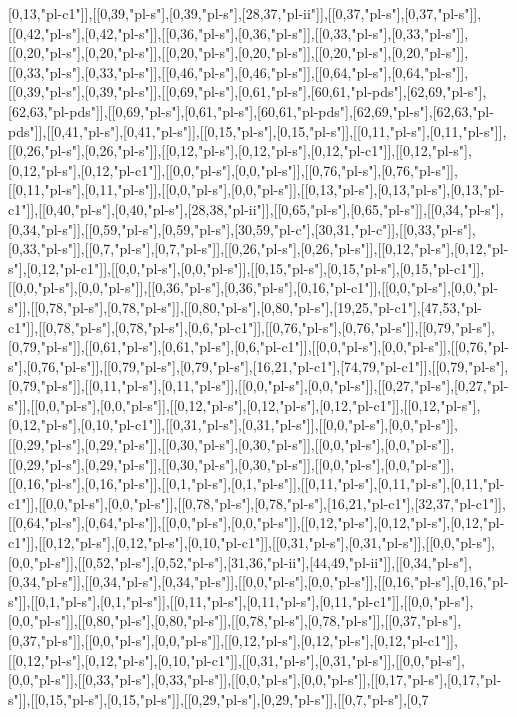 [0,13,"pl-c1"]],[[0,39,"pl-s"],[0,39,"pl-s"],[28,37,"pl-ii"]],[[0,37,"pl-s"],[0,37,"pl-s"]],[[0,42,"pl-s"],[0,42,"pl-s"]],[[0,36,"pl-s"],[0,36,"pl-s"]],[[0,33,"pl-s"],[0,33,"pl-s"]],[[0,20,"pl-s"],[0,20,"pl-s"]],[[0,20,"pl-s"],[0,20,"pl-s"]],[[0,20,"pl-s"],[0,20,"pl-s"]],[[0,33,"pl-s"],[0,33,"pl-s"]],[[0,46,"pl-s"],[0,46,"pl-s"]],[[0,64,"pl-s"],[0,64,"pl-s"]],[[0,39,"pl-s"],[0,39,"pl-s"]],[[0,69,"pl-s"],[0,61,"pl-s"],[60,61,"pl-pds"],[62,69,"pl-s"],[62,63,"pl-pds"]],[[0,69,"pl-s"],[0,61,"pl-s"],[60,61,"pl-pds"],[62,69,"pl-s"],[62,63,"pl-pds"]],[[0,41,"pl-s"],[0,41,"pl-s"]],[[0,15,"pl-s"],[0,15,"pl-s"]],[[0,11,"pl-s"],[0,11,"pl-s"]],[[0,26,"pl-s"],[0,26,"pl-s"]],[[0,12,"pl-s"],[0,12,"pl-s"],[0,12,"pl-c1"]],[[0,12,"pl-s"],[0,12,"pl-s"],[0,12,"pl-c1"]],[[0,0,"pl-s"],[0,0,"pl-s"]],[[0,76,"pl-s"],[0,76,"pl-s"]],[[0,11,"pl-s"],[0,11,"pl-s"]],[[0,0,"pl-s"],[0,0,"pl-s"]],[[0,13,"pl-s"],[0,13,"pl-s"],[0,13,"pl-c1"]],[[0,40,"pl-s"],[0,40,"pl-s"],[28,38,"pl-ii"]],[[0,65,"pl-s"],[0,65,"pl-s"]],[[0,34,"pl-s"],[0,34,"pl-s"]],[[0,59,"pl-s"],[0,59,"pl-s"],[30,59,"pl-c"],[30,31,"pl-c"]],[[0,33,"pl-s"],[0,33,"pl-s"]],[[0,7,"pl-s"],[0,7,"pl-s"]],[[0,26,"pl-s"],[0,26,"pl-s"]],[[0,12,"pl-s"],[0,12,"pl-s"],[0,12,"pl-c1"]],[[0,0,"pl-s"],[0,0,"pl-s"]],[[0,15,"pl-s"],[0,15,"pl-s"],[0,15,"pl-c1"]],[[0,0,"pl-s"],[0,0,"pl-s"]],[[0,36,"pl-s"],[0,36,"pl-s"],[0,16,"pl-c1"]],[[0,0,"pl-s"],[0,0,"pl-s"]],[[0,78,"pl-s"],[0,78,"pl-s"]],[[0,80,"pl-s"],[0,80,"pl-s"],[19,25,"pl-c1"],[47,53,"pl-c1"]],[[0,78,"pl-s"],[0,78,"pl-s"],[0,6,"pl-c1"]],[[0,76,"pl-s"],[0,76,"pl-s"]],[[0,79,"pl-s"],[0,79,"pl-s"]],[[0,61,"pl-s"],[0,61,"pl-s"],[0,6,"pl-c1"]],[[0,0,"pl-s"],[0,0,"pl-s"]],[[0,76,"pl-s"],[0,76,"pl-s"]],[[0,79,"pl-s"],[0,79,"pl-s"],[16,21,"pl-c1"],[74,79,"pl-c1"]],[[0,79,"pl-s"],[0,79,"pl-s"]],[[0,11,"pl-s"],[0,11,"pl-s"]],[[0,0,"pl-s"],[0,0,"pl-s"]],[[0,27,"pl-s"],[0,27,"pl-s"]],[[0,0,"pl-s"],[0,0,"pl-s"]],[[0,12,"pl-s"],[0,12,"pl-s"],[0,12,"pl-c1"]],[[0,12,"pl-s"],[0,12,"pl-s"],[0,10,"pl-c1"]],[[0,31,"pl-s"],[0,31,"pl-s"]],[[0,0,"pl-s"],[0,0,"pl-s"]],[[0,29,"pl-s"],[0,29,"pl-s"]],[[0,30,"pl-s"],[0,30,"pl-s"]],[[0,0,"pl-s"],[0,0,"pl-s"]],[[0,29,"pl-s"],[0,29,"pl-s"]],[[0,30,"pl-s"],[0,30,"pl-s"]],[[0,0,"pl-s"],[0,0,"pl-s"]],[[0,16,"pl-s"],[0,16,"pl-s"]],[[0,1,"pl-s"],[0,1,"pl-s"]],[[0,11,"pl-s"],[0,11,"pl-s"],[0,11,"pl-c1"]],[[0,0,"pl-s"],[0,0,"pl-s"]],[[0,78,"pl-s"],[0,78,"pl-s"],[16,21,"pl-c1"],[32,37,"pl-c1"]],[[0,64,"pl-s"],[0,64,"pl-s"]],[[0,0,"pl-s"],[0,0,"pl-s"]],[[0,12,"pl-s"],[0,12,"pl-s"],[0,12,"pl-c1"]],[[0,12,"pl-s"],[0,12,"pl-s"],[0,10,"pl-c1"]],[[0,31,"pl-s"],[0,31,"pl-s"]],[[0,0,"pl-s"],[0,0,"pl-s"]],[[0,52,"pl-s"],[0,52,"pl-s"],[31,36,"pl-ii"],[44,49,"pl-ii"]],[[0,34,"pl-s"],[0,34,"pl-s"]],[[0,34,"pl-s"],[0,34,"pl-s"]],[[0,0,"pl-s"],[0,0,"pl-s"]],[[0,16,"pl-s"],[0,16,"pl-s"]],[[0,1,"pl-s"],[0,1,"pl-s"]],[[0,11,"pl-s"],[0,11,"pl-s"],[0,11,"pl-c1"]],[[0,0,"pl-s"],[0,0,"pl-s"]],[[0,80,"pl-s"],[0,80,"pl-s"]],[[0,78,"pl-s"],[0,78,"pl-s"]],[[0,37,"pl-s"],[0,37,"pl-s"]],[[0,0,"pl-s"],[0,0,"pl-s"]],[[0,12,"pl-s"],[0,12,"pl-s"],[0,12,"pl-c1"]],[[0,12,"pl-s"],[0,12,"pl-s"],[0,10,"pl-c1"]],[[0,31,"pl-s"],[0,31,"pl-s"]],[[0,0,"pl-s"],[0,0,"pl-s"]],[[0,33,"pl-s"],[0,33,"pl-s"]],[[0,0,"pl-s"],[0,0,"pl-s"]],[[0,17,"pl-s"],[0,17,"pl-s"]],[[0,15,"pl-s"],[0,15,"pl-s"]],[[0,29,"pl-s"],[0,29,"pl-s"]],[[0,7,"pl-s"],[0,7